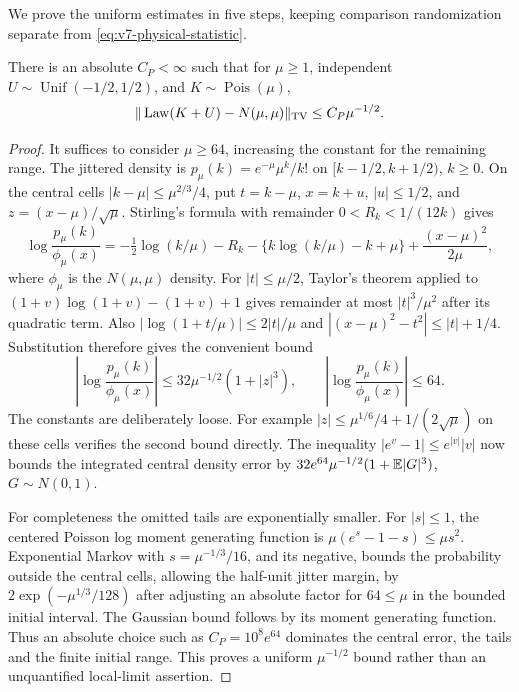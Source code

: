 We prove the uniform estimates in five steps, keeping comparison
randomization separate from \eqref{eq:v7-physical-statistic}.

\begin{lemma}
\label{lem:v7-poisson-normal}
There is an absolute $C_P<\infty$ such that for $\mu\ge1$, independent
$U\sim\operatorname{Unif}(-1/2,1/2)$, and $K\sim\operatorname{Pois}(\mu)$,
\begin{equation}
          \|\operatorname{Law}(K+U)-N(\mu,\mu)\|_{\rm TV}
                                      \le C_P\mu^{-1/2}. 
                                                               \label{eq:v7-poisson-normal}
\end{equation}
\end{lemma}
\begin{proof}
It suffices to consider $\mu\ge64$, increasing the constant for the
remaining range. The jittered density is $p_\mu(k)=e^{-\mu}\mu^k/k!$
on $[k-1/2,k+1/2)$, $k\ge0$. On the central cells
$|k-\mu|\le\mu^{2/3}/4$, put $t=k-\mu$, $x=k+u$, $|u|\le1/2$,
and $z=(x-\mu)/\sqrt\mu$. Stirling's formula with remainder
$0<R_k<1/(12k)$ gives
\[
 \log\frac{p_\mu(k)}{\phi_\mu(x)}
 =-\tfrac12\log(k/\mu)-R_k
  -\{k\log(k/\mu)-k+\mu\}+\frac{(x-\mu)^2}{2\mu},
\]
where $\phi_\mu$ is the $N(\mu,\mu)$ density. For $|t|\le\mu/2$,
Taylor's theorem applied to $(1+v)\log(1+v)-(1+v)+1$ gives remainder
at most $|t|^3/\mu^2$ after its quadratic term. Also
$|\log(1+t/\mu)|\le2|t|/\mu$ and
$|(x-\mu)^2-t^2|\le |t|+1/4$. Substitution therefore gives the
convenient bound
\begin{equation}
 \left|\log\frac{p_\mu(k)}{\phi_\mu(x)}\right|
 \le 32\mu^{-1/2}(1+|z|^3),\qquad
 \left|\log\frac{p_\mu(k)}{\phi_\mu(x)}\right|\le64.   \label{eq:v7-stirling-bound}
\end{equation}
The constants are deliberately loose. For example
$|z|\le\mu^{1/6}/4+1/(2\sqrt\mu)$ on these cells verifies the
second bound directly. The inequality $|e^v-1|\le e^{|v|}|v|$ now
bounds the integrated central density error by
$32e^{64}\mu^{-1/2}(1+\mathbb E|G|^3)$, $G\sim N(0,1)$.

For completeness the omitted tails are exponentially smaller. For
$|s|\le1$, the centered Poisson log moment generating function is
$\mu(e^s-1-s)\le\mu s^2$. Exponential Markov with
$s=\mu^{-1/3}/16$, and its negative, bounds the probability outside
the central cells, allowing the half-unit jitter margin, by
$2\exp(-\mu^{1/3}/128)$ after adjusting an absolute factor for
$64\le\mu$ in the bounded initial interval. The Gaussian bound follows
by its moment generating function. Thus an absolute choice such as
$C_P=10^8e^{64}$ dominates the central error, the tails and the finite
initial range. This proves a uniform $\mu^{-1/2}$ bound rather than
an unquantified local-limit assertion.
\end{proof}

